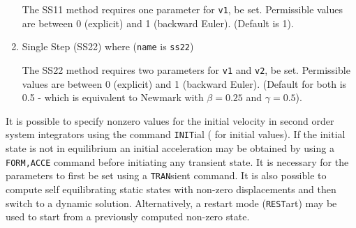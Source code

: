 \begin{enumerate}
{The SS11 method requires  one  parameter  for
{\tt v1}, be set.  Permissible values are between 0 (explicit) and
1 (backward Euler). (Default is 1). 
}
\item{
Single Step (SS22) where ({\tt name} is {\tt ss22})

The SS22 method requires  two  parameters  for
\texttt{v1} and \texttt{v2}, be set.
Permissible values are between 0 (explicit) and
1 (backward Euler). (Default for both is 0.5 - which is equivalent
to Newmark with $\beta = 0.25$ and $\gamma = 0.5$). 
}
\end{enumerate}

It is possible to specify nonzero values for  the  initial
velocity  in second order system integrators using the
command {\tt INIT}ial ( for initial values).  If the  initial
state  is  not in equilibrium an initial acceleration may be
obtained by using a {\tt FORM,ACCE} command before initiating
any transient state.  It is necessary for the parameters
to first be set using a {\tt TRAN}sient command.  It is also
possible to compute self equilibrating static states with
non-zero displacements and then switch to a dynamic solution.
Alternatively, a restart mode ({\tt REST}art) may be used to
start from a previously computed non-zero state.
\vfill\eject
